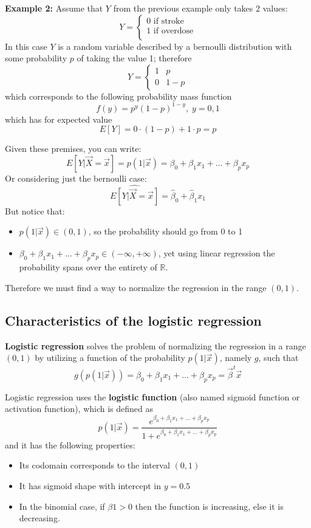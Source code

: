     \textbf{Example 2:} Assume that $Y$ from the previous example only takes 2 values:
    $$
    Y = \begin{cases}
          0 \text{ if stroke} \\
	      1 \text{ if overdose} \\
        \end{cases}
    $$
    In this case $Y$ is a random variable described by a bernoulli distribution with some probability $p$ of taking the value 1; therefore 
    $$
    Y = \begin{cases}
          1 & p \\
	      0 & 1-p
        \end{cases}
    $$
    which corresponds to the following probability mass function
    $$f(y) = p^y(1-p)^{1-y}, \; y=0,1$$
    which has for expected value
    $$E[Y] = 0 \cdot (1-p) + 1 \cdot p = p$$

    Given these premises, you can write:
    $$E[Y|\vec{X} = \vec{x}] = p(1|\vec{x}) = \beta_0 + \beta_1 x_1 + \dots + \beta_px_p$$
    Or considering just the bernoulli case:
    $$\hat{E[Y|\vec{X} = \vec{x}]} = \hat{\beta}_0 + \hat{\beta}_1x_1$$
    But notice that:
    \begin{itemize}
      \item $p(1|\vec{x}) \in (0, 1)$, so the probability should go from 0 to 1
      \item $\beta_0 + \beta_1 x_1 + \dots + \beta_px_p \in (-\infty, +\infty)$, yet using linear regression the probability spans over the entirety of $\mathbb{R}$.
    \end{itemize}
    Therefore we must find a way to normalize the regression in the range $(0,1)$.
    
    \subsection{Characteristics of the logistic regression}
    \textbf{Logistic regression} solves the problem of normalizing the regression in a range $(0,1)$ by utilizing a function of the probability $p(1|\vec{x})$, namely $g$, such that
    $$g(p(1|\vec{x})) = \beta_0 + \beta_1 x_1 + \dots + \beta_px_p = \vec{\beta}^t\vec{x}$$
    
    Logistic regression uses the \textbf{logistic function} (also named sigmoid function or activation function), which is defined as
    $$p(1|\vec{x}) = \frac{e^{\beta_0 + \beta_1 x_1 + \dots + \beta_p x_p}}
                          {1+e^{\beta_0 + \beta_1 x_1 + \dots + \beta_p x_p}}$$
    and it has the following properties:
    \begin{itemize}
      \item Its codomain corresponds to the interval $(0,1)$
      \item It has sigmoid shape with intercept in $y=0.5$
      \item In the binomial case, if $\beta{1} > 0$ then the function is increasing, else it is decreasing.
    \end{itemize}
    
